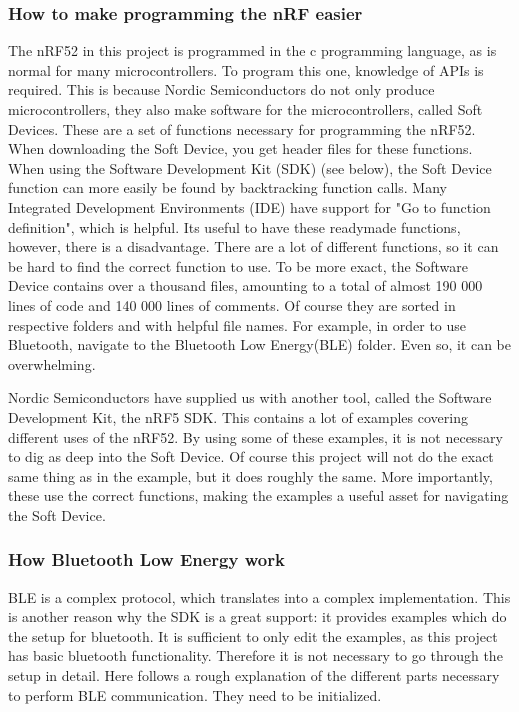 \subsubsection{How to make programming the nRF easier}
The nRF52 in this project is programmed in the c programming language, as is normal for many microcontrollers. To program this one, knowledge of APIs is required. This is because Nordic Semiconductors do not only produce microcontrollers, they also make software for the microcontrollers, called Soft Devices. These are a set of functions necessary for programming the nRF52. When downloading the Soft Device, you get header files for these functions. When using the Software Development Kit (SDK) (see below), the Soft Device function can more easily be found by backtracking function calls. Many  Integrated Development Environments (IDE) have support for "Go to function definition", which is helpful. 
Its useful to have these readymade functions, however, there is a disadvantage. There are a lot of different functions, so it can be hard to find the correct function to use. To be more exact, the Software Device contains over a thousand files, amounting to a total of almost 190 000 lines of code and 140 000 lines of comments. Of course they are sorted in respective folders and with helpful file names. For example, in order to use Bluetooth, navigate to the Bluetooth Low Energy(BLE) folder. Even so, it can be overwhelming.

Nordic Semiconductors have supplied us with another tool, called the Software Development Kit, the nRF5 SDK. This contains a lot of examples covering different uses of the nRF52. By using some of these examples, it is not necessary to dig as deep into the Soft Device. Of course this project will not do the exact same thing as in the example, but it does roughly the same. More importantly, these use the correct functions, making the examples a useful asset for navigating the Soft Device.

\subsubsection{How Bluetooth Low Energy work}
BLE is a complex protocol, which translates into a complex implementation. This is another reason why the SDK is a great support: it provides examples which do the setup for bluetooth. It is sufficient to only  edit the examples, as this project has basic bluetooth functionality. Therefore it is not necessary to go through the setup in detail. Here follows a rough explanation of the different parts necessary to perform BLE communication. They need to be initialized.

